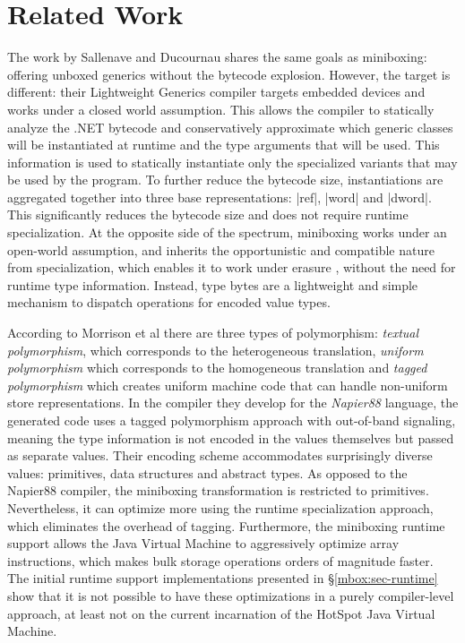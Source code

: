 \section{Related Work}
\label{mbox:sec-related}

The work by {Sallenave} and {Ducournau} \cite{lightweight-generics} shares the same goals as miniboxing: offering unboxed generics without the bytecode explosion. However, the target is different: their Lightweight Generics compiler targets embedded devices and works under a closed world assumption. This allows the compiler to statically analyze the .NET bytecode and conservatively approximate which generic classes will be instantiated at runtime and the type arguments that will be used. This information is used to statically instantiate only the specialized variants that may be used by the program. To further reduce the bytecode size, instantiations are aggregated together into three base representations: |ref|, |word| and |dword|. This significantly reduces the bytecode size and does not require runtime specialization. At the opposite side of the spectrum, miniboxing works under an open-world assumption, and inherits the opportunistic and compatible nature from specialization, which enables it to work under erasure \cite{java-erasure}, without the need for runtime type information. Instead, type bytes are a lightweight and simple mechanism to dispatch operations for encoded value types.

According to {Morrison et al} \cite{morrison-napier88} there are three types of polymorphism: {\em textual polymorphism}, which corresponds to the heterogeneous translation, {\em uniform polymorphism} which corresponds to the homogeneous translation and {\em tagged polymorphism} which creates uniform machine code that can handle non-uniform store representations. In the compiler they develop for the {\em Napier88} language, the generated code uses a tagged polymorphism approach with out-of-band signaling, meaning the type information is not encoded in the values themselves but passed as separate values. Their encoding scheme accommodates surprisingly diverse values: primitives, data structures and abstract types. As opposed to the Napier88 compiler, the miniboxing transformation is restricted to primitives. Nevertheless, it can optimize more using the runtime specialization approach, which eliminates the overhead of tagging. Furthermore, the miniboxing runtime support allows the Java Virtual Machine to aggressively optimize array instructions, which makes bulk storage operations orders of magnitude faster. The initial runtime support implementations presented in \S\ref{mbox:sec-runtime} show that it is not possible to have these optimizations in a purely compiler-level approach, at least not on the current incarnation of the HotSpot Java Virtual Machine.

